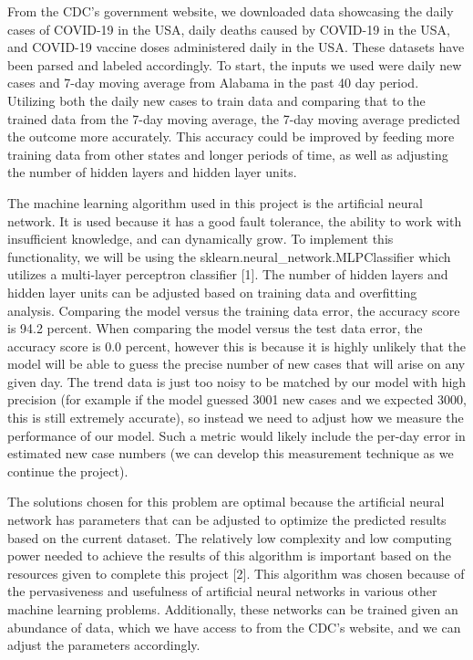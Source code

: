 \documentclass[conference]{IEEEtran}
\begin{document}
From the CDC's government website, we downloaded data showcasing the daily cases of COVID-19 in the USA, daily deaths caused by COVID-19 in the USA, and COVID-19 vaccine doses administered daily in the USA. These datasets have been parsed and labeled accordingly. To start, the inputs we used were daily new cases and 7-day moving average from Alabama in the past 40 day period. Utilizing both the daily new cases to train data and comparing that to the trained data from the 7-day moving average, the 7-day moving average predicted the outcome more accurately. This accuracy could be improved by feeding more training data from other states and longer periods of time, as well as adjusting the number of hidden layers and hidden layer units. 

The machine learning algorithm used in this project is the artificial neural network. It is used because it has a good fault tolerance, the ability to work with insufficient knowledge, and can dynamically grow. To implement this functionality, we will be using the sklearn.neural\_network.MLPClassifier which utilizes a multi-layer perceptron classifier [1]. The number of hidden layers and hidden layer units can be adjusted based on training data and overfitting analysis. Comparing the model versus the training data error, the accuracy score is 94.2 percent. When comparing the model versus the test data error, the accuracy score is 0.0 percent, however this is because it is highly unlikely that the model will be able to guess the precise number of new cases that will arise on any given day. The trend data is just too noisy to be matched by our model with high precision (for example if the model guessed 3001 new cases and we expected 3000, this is still extremely accurate), so instead we need to adjust how we measure the performance of our model. Such a metric would likely include the per-day error in estimated new case numbers (we can develop this measurement technique as we continue the project).

The solutions chosen for this problem are optimal because the artificial neural network has parameters that can be adjusted to optimize the predicted results based on the current dataset. The relatively low complexity and low computing power needed to achieve the results of this algorithm is important based on the resources given to complete this project [2]. This algorithm was chosen because of the pervasiveness and usefulness of artificial neural networks in various other machine learning problems. Additionally, these networks can be trained given an abundance of data, which we have access to from the CDC's website, and we can adjust the parameters accordingly. 
\end{document}
